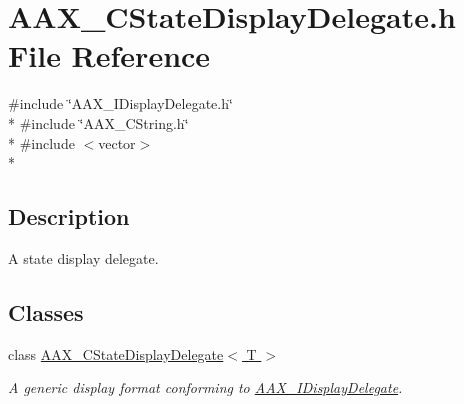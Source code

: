 \hypertarget{a00195}{}\section{A\+A\+X\+\_\+\+C\+State\+Display\+Delegate.\+h File Reference}
\label{a00195}
{\ttfamily \#include \char`\"{}A\+A\+X\+\_\+\+I\+Display\+Delegate.\+h\char`\"{}}\\*
{\ttfamily \#include \char`\"{}A\+A\+X\+\_\+\+C\+String.\+h\char`\"{}}\\*
{\ttfamily \#include $<$vector$>$}\\*


\subsection{Description}
A state display delegate. 

\subsection*{Classes}
\begin{DoxyCompactItemize}
\item 
class \hyperlink{a00039}{A\+A\+X\+\_\+\+C\+State\+Display\+Delegate$<$ T $>$}
\begin{DoxyCompactList}\small\item\em A generic display format conforming to \hyperlink{a00092}{A\+A\+X\+\_\+\+I\+Display\+Delegate}. \end{DoxyCompactList}\end{DoxyCompactItemize}
